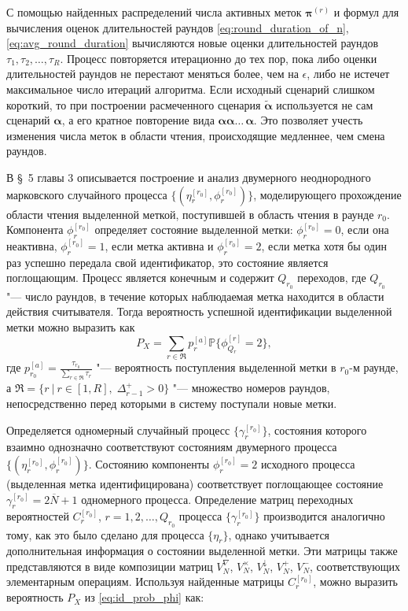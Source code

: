 С помощью найденных распределений числа активных меток $\bm{\pi}^{(r)}$ и формул для вычисления оценок длительностей раундов \eqref{eq:round_duration_of_n}, \eqref{eq:avg_round_duration} вычисляются новые оценки длительностей раундов $\tau_1, \tau_2, \dots, \tau_R$. Процесс повторяется итерационно до тех пор, пока либо оценки длительностей раундов не перестают меняться более, чем на $\epsilon$, либо не истечет максимальное число итераций алгоритма. Если исходный сценарий слишком короткий, то при построении расмеченного сценария $\widetilde{\bm{\alpha}}$ используется не сам сценарий $\bm{\alpha}$, а его кратное повторение вида $\bm{\alpha} \bm{\alpha} \dots\, \bm{\alpha}$. Это позволяет учесть изменения числа меток в области чтения, происходящие медленнее, чем смена раундов.

В \S~5 главы 3 описывается построение и анализ двумерного неоднородного марковского случайного процесса $\{ (\eta_r^{[r_0]}, \phi_r^{[r_0]}) \}$, моделирующего прохождение области чтения выделенной меткой, поступившей в область чтения в раунде $r_0$. Компонента $\phi_r^{[r_0]}$ определяет состояние выделенной метки: $\phi_r^{[r_0]} = 0$, если она неактивна, $\phi_r^{[r_0]} = 1$, если метка активна и $\phi_r^{[r_0]} = 2$, если метка хотя бы один раз успешно передала свой идентификатор, это состояние является поглощающим. Процесс является конечным и содержит $Q_{r_0}$ переходов, где $Q_{r_0}$ "--- число раундов, в течение которых наблюдаемая метка находится в области действия считывателя. Тогда вероятность успешной идентификации выделенной метки можно выразить как
\begin{equation}\label{eq:id_prob_phi}
  P_X = \sum\limits_{r \in \mathfrak{R}} p^{[a]}_r \mathbb{P}\{ \phi^{[r]}_{Q_r} = 2 \},
\end{equation}
где $p^{[a]}_{r_0} = \frac{\tau_{r_0}}{\sum_{r \in \mathfrak{R}} \tau_r}$ "--- вероятность поступления выделенной метки в $r_0$-м раунде, а $\mathfrak{R} = \{ r\:|\:r \in [1, R],\; \Delta_{r-1}^+ > 0 \}$ "--- множество номеров раундов, непосредственно перед которыми в систему поступали новые метки.

Определяется одномерный случайный процесс $\{ \gamma_r^{[r_0]} \}$, состояния которого взаимно однозначно соответствуют состояниям двумерного процесса $\{ (\eta_r^{[r_0]}, \phi_r^{[r_0]}) \}$. Состоянию компоненты $\phi_r^{[r_0]} = 2$ исходного процесса (выделенная метка идентифицирована) соответствует поглощающее состояние $\gamma_r^{[r_0]} = 2\overline{N}+1$ одномерного процесса. Определение матриц переходных вероятностей $C_r^{[r_0]}$, $r = 1, 2, \dots, Q_{r_0}$ процесса $\{ \gamma_r^{[r_0]} \}$ производится аналогично тому, как это было сделано для процесса $\{ \eta_r \}$, однако учитывается дополнительная информация о состоянии выделенной метки. Эти матрицы также представляются в виде композиции матриц $V^\nabla_N$, $V^\times_N$, $V^\downarrow_N$, $V^+_N$, $V^-_N$, соответствующих элементарным операциям. Используя найденные матрицы $C_r^{[r_0]}$, можно выразить вероятность $P_X$ из \eqref{eq:id_prob_phi} как:

